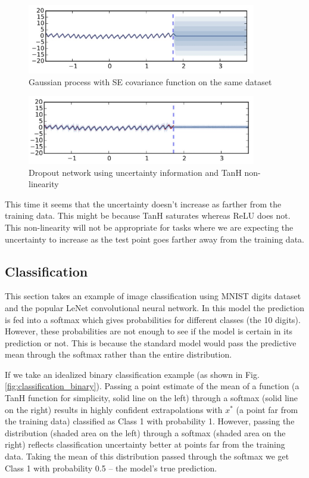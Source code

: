 \begin{figure}[H]
    \centering
    \includegraphics[width=10cm]{figs/Regression using Gaussian Process.png}
    \caption{Gaussian process with SE covariance function on the same dataset}
    \label{fig:regression_GP}
\end{figure}

\begin{figure}[H]
    \centering
    \includegraphics[width=10cm]{figs/Regression using TanH.png}
    \caption{Dropout network using uncertainty information and TanH non-linearity}
    \label{fig:regression_tanh}
\end{figure}

This time it seems that the uncertainty doesn't increase as farther from the training data. This might be because TanH saturates whereas ReLU does not. This non-linearity will not be appropriate for tasks where we are expecting the uncertainty to increase as the test point goes farther away from the training data.

\subsection{Classification}
This section takes an example of image classification using MNIST digits dataset and the popular LeNet convolutional neural network. In this model the prediction is fed into a softmax which gives probabilities for different classes (the 10 digits). However, these probabilities are not enough to see if the model is certain in its prediction or not. This is because the standard model would pass the predictive mean through the softmax rather than the entire distribution.

If we take an idealized binary classification example (as shown in Fig. \ref{fig:classification_binary}). Passing a point estimate of the mean of a function (a TanH function for simplicity, solid line on the left) through a softmax (solid line on the right) results in highly confident extrapolations with $x^*$ (a point far from the training data) classified as Class 1 with probability 1. However, passing the distribution (shaded area on the left) through a softmax (shaded area on the right) reflects classification uncertainty better at points far from the training data. Taking the mean of this distribution passed through the softmax we get Class 1 with probability 0.5 -- the model's true prediction.

